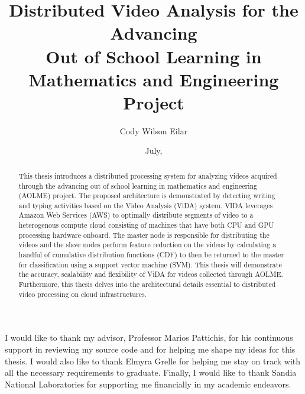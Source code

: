 \documentclass[botnum, fleqn, final]{unmeethesis}
\begin{document}
  \frontmatter



  \title{Distributed Video Analysis for the  Advancing  \\
  Out of School Learning in Mathematics and Engineering Project}

  \author{Cody Wilson Eilar}
  \date{July, \thisyear}

  \maketitle



  \begin{acknowledgments}
    \vspace{1.1in}
    I would like to thank my advisor, Professor Marios Pattichis, for his
    continuous support in reviewing my source code and for helping me shape my
    ideas for this thesis. I would also like to thank Elmyra Grelle for helping
    me stay on track with all the necessary requirements to graduate. Finally, I
    would like to thank Sandia National Laboratories for supporting me
    financially in my academic endeavors.
  \end{acknowledgments}

  \maketitleabstract %

  \begin{abstract}
    This thesis introduces a distributed processing system for analyzing videos
    acquired through the advancing out of school learning in mathematics and
    engineering \\ (AOLME)
     project. The proposed architecture is demonstrated by
    detecting writing and typing activities based on the Video Analysis (ViDA)
    system. VIDA leverages Amazon Web Services (AWS) to optimally distribute
    segments of video to a heterogenous compute cloud consisting of machines
    that have both CPU and GPU processing hardware onboard. The master node is
    responsible for distributing the videos and the slave nodes perform feature
    reduction on the videos by calculating a handful of cumulative distribution
    functions (CDF) to then be returned to the master for classification using a
    support vector machine (SVM). This thesis will demonstrate the accuracy,
    scalability and flexibility of ViDA for videos collected through AOLME.
    Furthermore, this thesis delves into the architectural details essential to
    distributed video processing on cloud infrastructures.

    \clearpage %
  \end{abstract}
\end{document}
